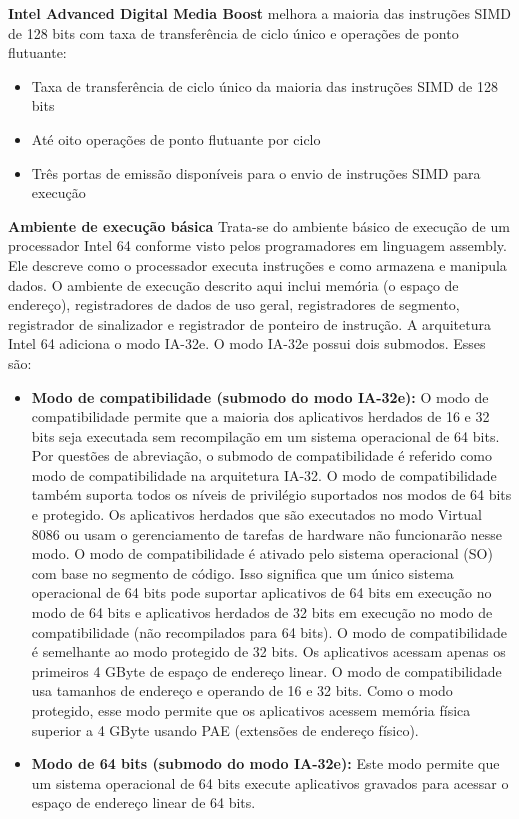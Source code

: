 \documentclass[12pt,a4paper,brazilian,utf8]{ppgsi}
\begin{document}
    
    \textbf{Intel Advanced Digital Media Boost}
    melhora a maioria das instruções SIMD de 128 bits com taxa de transferência de ciclo único e operações de ponto flutuante:
    \begin{itemize}
        \item Taxa de transferência de ciclo único da maioria das instruções SIMD de 128 bits
        \item Até oito operações de ponto flutuante por ciclo
        \item Três portas de emissão disponíveis para o envio de instruções SIMD para execução
    \end{itemize}

    \textbf{Ambiente de execução básica}
    Trata-se do ambiente básico de execução de um processador Intel 64 conforme visto pelos programadores em linguagem assembly. Ele descreve como o processador executa instruções e como armazena e manipula dados. O ambiente de execução descrito aqui inclui memória (o espaço de endereço), registradores de dados de uso geral, registradores de segmento, registrador de sinalizador e registrador de ponteiro de instrução.
    A arquitetura Intel 64 adiciona o modo IA-32e. O modo IA-32e possui dois submodos. Esses são:
    \begin{itemize}
        \item \textbf{Modo de compatibilidade (submodo do modo IA-32e):} O modo de compatibilidade permite que a maioria dos aplicativos herdados de 16 e 32 bits seja executada sem recompilação em um sistema operacional de 64 bits. Por questões de abreviação, o submodo de compatibilidade é referido como modo de compatibilidade na arquitetura IA-32. O modo de compatibilidade também suporta todos os níveis de privilégio suportados nos modos de 64 bits e protegido. Os aplicativos herdados que são executados no modo Virtual 8086 ou usam o gerenciamento de tarefas de hardware não funcionarão nesse modo. O modo de compatibilidade é ativado pelo sistema operacional (SO) com base no segmento de código. Isso significa que um único sistema operacional de 64 bits pode suportar aplicativos de 64 bits em execução no modo de 64 bits e aplicativos herdados de 32 bits em execução no modo de compatibilidade (não recompilados para 64 bits). O modo de compatibilidade é semelhante ao modo protegido de 32 bits. Os aplicativos acessam apenas os primeiros 4 GByte de espaço de endereço linear. O modo de compatibilidade usa tamanhos de endereço e operando de 16 e 32 bits. Como o modo protegido, esse modo permite que os aplicativos acessem memória física superior a 4 GByte usando PAE (extensões de endereço físico).
        \item \textbf{Modo de 64 bits (submodo do modo IA-32e):} Este modo permite que um sistema operacional de 64 bits execute aplicativos gravados para acessar o espaço de endereço linear de 64 bits.
    \end{itemize}
\end{document}

